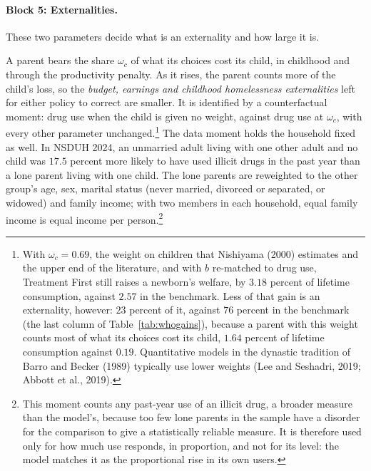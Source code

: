 \documentclass[10pt]{article}
\begin{document}
\paragraph{Block 5: Externalities.} These two parameters decide what is an externality and how large it is.

\begin{description}\setlength{\itemsep}{0.25em}\setlength{\parskip}{0em}
\item[$\omega_c$, the parent's weight on its child.] A parent bears the share $\omega_c$ of what its choices cost its child, in childhood and through the productivity penalty. As it rises, the parent counts more of the child's loss, so the \emph{budget, earnings and childhood homelessness externalities} left for either policy to correct are smaller. It is identified by a counterfactual moment: drug use when the child is given no weight, against drug use at $\omega_c$, with every other parameter unchanged.\footnote{With $\omega_c=0.69$, the weight on children that Nishiyama (2000) estimates and the upper end of the literature, and with $b$ re-matched to drug use, Treatment First still raises a newborn's welfare, by $3.18$ percent of lifetime consumption, against $2.57$ in the benchmark. Less of that gain is an externality, however: $23$ percent of it, against $76$ percent in the benchmark (the last column of Table~\ref{tab:whogains}), because a parent with this weight counts most of what its choices cost its child, $1.64$ percent of lifetime consumption against $0.19$. Quantitative models in the dynastic tradition of Barro and Becker (1989) typically use lower weights (Lee and Seshadri, 2019; Abbott et al., 2019).} The data moment holds the household fixed as well. In NSDUH 2024, an unmarried adult living with one other adult and no child was $17.5$ percent more likely to have used illicit drugs in the past year than a lone parent living with one child. The lone parents are reweighted to the other group's age, sex, marital status (never married, divorced or separated, or widowed) and family income; with two members in each household, equal family income is equal income per person.\footnote{This moment counts any past-year use of an illicit drug, a broader measure than the model's, because too few lone parents in the sample have a disorder for the comparison to give a statistically reliable measure. It is therefore used only for how much use responds, in proportion, and not for its level: the model matches it as the proportional rise in its own users.}

\end{description}
\end{document}
